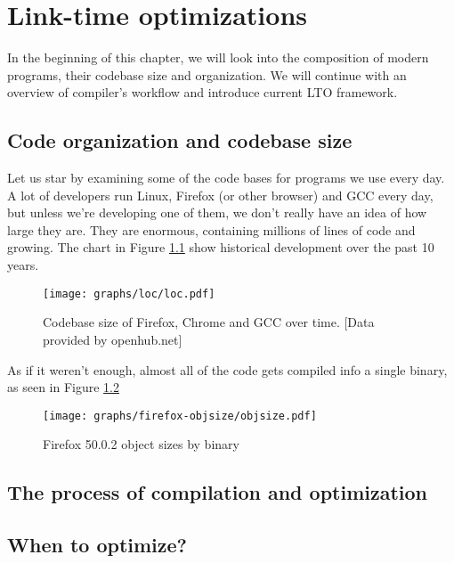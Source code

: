 %
\newcommand{\definice}{\paragraph{Definice.}}

\chapter{Link-time optimizations}

In the beginning of this chapter, we will look into the composition of modern
programs, their codebase size and organization. We will continue with an
overview of compiler's workflow and introduce current LTO framework.


\section{Code organization and codebase size}

Let us star by examining some of the code bases for programs we use every day.
A lot of developers run Linux, Firefox (or other browser) and GCC every day, but
unless we're developing one of them, we don't really have an idea of how large
they are. They are enormous, containing millions of lines of code and growing. 
The chart in Figure \ref{figure-loc} show historical development over the past 10
years.

\begin{figure}[h!]
\label{figure-loc}
\centering
\texttt{[image: graphs/loc/loc.pdf]}
\caption{Codebase size of Firefox, Chrome and GCC over time. [Data provided by
	openhub.net]}
\end{figure}

As if it weren't enough, almost all of the code gets compiled info a single
binary, as seen in Figure \ref{figure-firefox-objsize}

\begin{figure}[h!]
\label{figure-firefox-objsize}
\centering
\texttt{[image: graphs/firefox-objsize/objsize.pdf]}
\caption{Firefox 50.0.2 object sizes by binary}
\end{figure}



\section{The process of compilation and optimization}


\section{When to optimize?}


